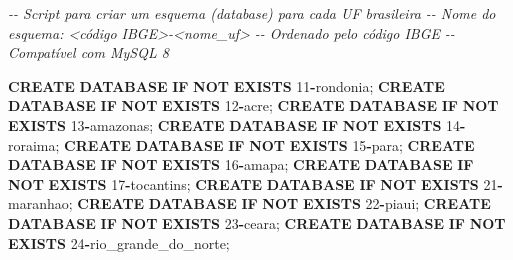 \documentclass[
]{book}
\newenvironment{Shaded}{\begin{snugshade}}{\end{snugshade}}
\newcommand{\CommentTok}[1]{\textcolor[rgb]{0.56,0.35,0.01}{\textit{#1}}}
\newcommand{\ControlFlowTok}[1]{\textcolor[rgb]{0.13,0.29,0.53}{\textbf{#1}}}
\newcommand{\DecValTok}[1]{\textcolor[rgb]{0.00,0.00,0.81}{#1}}
\newcommand{\KeywordTok}[1]{\textcolor[rgb]{0.13,0.29,0.53}{\textbf{#1}}}
\newcommand{\NormalTok}[1]{#1}
\newcommand{\OperatorTok}[1]{\textcolor[rgb]{0.81,0.36,0.00}{\textbf{#1}}}
\begin{document}
\begin{Shaded}
\begin{Highlighting}[]
\CommentTok{{-}{-} Script para criar um esquema (database) para cada UF brasileira}
\CommentTok{{-}{-} Nome do esquema: \textless{}código IBGE\textgreater{}{-}\textless{}nome\_uf\textgreater{}}
\CommentTok{{-}{-} Ordenado pelo código IBGE}
\CommentTok{{-}{-} Compatível com MySQL 8}

\KeywordTok{CREATE} \KeywordTok{DATABASE} \ControlFlowTok{IF} \KeywordTok{NOT} \KeywordTok{EXISTS}\NormalTok{ \textasciigrave{}}\DecValTok{11}\OperatorTok{{-}}\NormalTok{rondonia\textasciigrave{};}
\KeywordTok{CREATE} \KeywordTok{DATABASE} \ControlFlowTok{IF} \KeywordTok{NOT} \KeywordTok{EXISTS}\NormalTok{ \textasciigrave{}}\DecValTok{12}\OperatorTok{{-}}\NormalTok{acre\textasciigrave{};}
\KeywordTok{CREATE} \KeywordTok{DATABASE} \ControlFlowTok{IF} \KeywordTok{NOT} \KeywordTok{EXISTS}\NormalTok{ \textasciigrave{}}\DecValTok{13}\OperatorTok{{-}}\NormalTok{amazonas\textasciigrave{};}
\KeywordTok{CREATE} \KeywordTok{DATABASE} \ControlFlowTok{IF} \KeywordTok{NOT} \KeywordTok{EXISTS}\NormalTok{ \textasciigrave{}}\DecValTok{14}\OperatorTok{{-}}\NormalTok{roraima\textasciigrave{};}
\KeywordTok{CREATE} \KeywordTok{DATABASE} \ControlFlowTok{IF} \KeywordTok{NOT} \KeywordTok{EXISTS}\NormalTok{ \textasciigrave{}}\DecValTok{15}\OperatorTok{{-}}\NormalTok{para\textasciigrave{};}
\KeywordTok{CREATE} \KeywordTok{DATABASE} \ControlFlowTok{IF} \KeywordTok{NOT} \KeywordTok{EXISTS}\NormalTok{ \textasciigrave{}}\DecValTok{16}\OperatorTok{{-}}\NormalTok{amapa\textasciigrave{};}
\KeywordTok{CREATE} \KeywordTok{DATABASE} \ControlFlowTok{IF} \KeywordTok{NOT} \KeywordTok{EXISTS}\NormalTok{ \textasciigrave{}}\DecValTok{17}\OperatorTok{{-}}\NormalTok{tocantins\textasciigrave{};}
\KeywordTok{CREATE} \KeywordTok{DATABASE} \ControlFlowTok{IF} \KeywordTok{NOT} \KeywordTok{EXISTS}\NormalTok{ \textasciigrave{}}\DecValTok{21}\OperatorTok{{-}}\NormalTok{maranhao\textasciigrave{};}
\KeywordTok{CREATE} \KeywordTok{DATABASE} \ControlFlowTok{IF} \KeywordTok{NOT} \KeywordTok{EXISTS}\NormalTok{ \textasciigrave{}}\DecValTok{22}\OperatorTok{{-}}\NormalTok{piaui\textasciigrave{};}
\KeywordTok{CREATE} \KeywordTok{DATABASE} \ControlFlowTok{IF} \KeywordTok{NOT} \KeywordTok{EXISTS}\NormalTok{ \textasciigrave{}}\DecValTok{23}\OperatorTok{{-}}\NormalTok{ceara\textasciigrave{};}
\KeywordTok{CREATE} \KeywordTok{DATABASE} \ControlFlowTok{IF} \KeywordTok{NOT} \KeywordTok{EXISTS}\NormalTok{ \textasciigrave{}}\DecValTok{24}\OperatorTok{{-}}\NormalTok{rio\_grande\_do\_norte\textasciigrave{};}

\end{Highlighting}
\end{Shaded}
\end{document}
